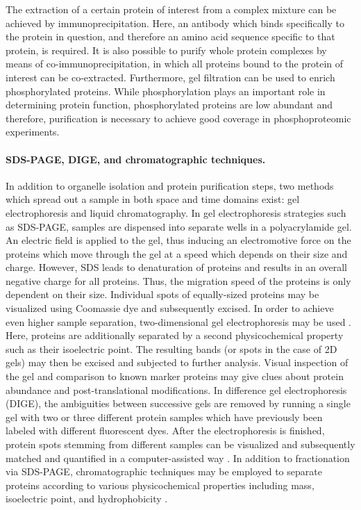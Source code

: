 The extraction of a certain protein of interest from a complex mixture can
be achieved by immunoprecipitation.
Here, an antibody which binds specifically to the protein in question,
and therefore an amino acid sequence specific to that protein, is required.
It is also possible to purify whole protein complexes by means of
co-immunoprecipitation, in which all proteins bound to the protein of interest
can be co-extracted.
Furthermore, gel filtration can be used to enrich phosphorylated proteins.
While phosphorylation plays an important role in determining protein function,
phosphorylated proteins are low abundant and therefore, purification is
necessary to achieve good coverage in phosphoproteomic experiments.

\paragraph{SDS-PAGE, DIGE, and chromatographic techniques.}

In addition to organelle isolation and protein purification steps, 
two methods which spread out a sample in both space and time domains exist: 
gel electrophoresis and liquid chromatography.
In gel electrophoresis strategies such as SDS-PAGE, samples are dispensed
into separate wells in a polyacrylamide gel.
An electric field is applied to the gel, thus inducing an electromotive force 
on the proteins which move through the gel at a speed which depends on their
size and charge.
However, SDS leads to denaturation of proteins and results in an overall
negative charge for all proteins. 
Thus, the migration speed of the proteins is only dependent on their size. 
Individual spots of equally-sized proteins may be visualized using Coomassie 
dye and subsequently excised.
In order to achieve even higher sample separation, two-dimensional gel 
electrophoresis may be used \citep{Klose1975, O'Farrell1975}.
Here, proteins are additionally separated by a second physicochemical property
such as their isoelectric point.
The resulting bands (or spots in the case of 2D gels) may then be excised and 
subjected to further analysis.
Visual inspection of the gel and comparison to known marker proteins may give 
clues about protein abundance and post-translational modifications.
In difference gel electrophoresis (DIGE), the ambiguities between successive 
gels are removed by running a single gel with two or three different protein
samples which have previously been labeled with different fluorescent dyes.
After the electrophoresis is finished, protein spots stemming from different 
samples can be visualized and subsequently matched and quantified in a 
computer-assisted way \citep{Berth2007}.
In addition to fractionation via SDS-PAGE, chromatographic techniques may be
employed to separate proteins according to various physicochemical properties
including mass, isoelectric point, and hydrophobicity \citep{Neverova2005}.

